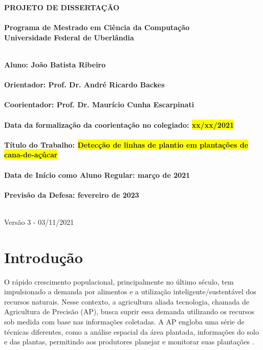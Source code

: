 \documentclass[12pt, a4paper, english, brazil]{article}
\newcommand{\textRed}[1]{{{\color{red} #1}}}
\begin{document}
\rhead{\thepage}

\begin{center}
	\bf{\LARGE{PROJETO DE DISSERTAÇÃO}\\ $\ $\\}
	\Large{Programa de Mestrado em Ciência da Computação\\
		Universidade Federal de Uberlândia}\\ $\ $\\
\end{center}

\begin{center}
	\bf{Aluno: João Batista Ribeiro\\ $\ $\\
		Orientador: Prof. Dr. André Ricardo Backes\\ $\ $\\
		Coorientador: Prof. Dr. Maurício Cunha Escarpinati\\ $\ $\\
		Data da formalização da coorientação no colegiado: \colorbox{yellow}{xx/xx/2021}\\ $\ $\\
		Título do Trabalho: \colorbox{yellow}{Detecção de linhas de plantio em plantações de cana-de-açúcar}\\ $\ $\\
		Data de Início como Aluno Regular: março de 2021\\ $\ $\\
		Previsão da Defesa: fevereiro de 2023\\ $\ $\\}
\end{center}

\textRed{Versão 3 - 03/11/2021}

\section{Introdução}

O rápido crescimento populacional, principalmente no último século, tem impulsionado a demanda por alimentos e a utilização inteligente/sustentável dos recursos naturais. Nesse contexto, a agricultura aliada tecnologia, chamada de Agricultura de Precisão (AP), busca suprir essa demanda utilizando os recursos sob medida com base nas informações coletadas. A AP engloba uma série de técnicas diferentes, como a análise espacial da área plantada, informações do solo e das plantas, permitindo aos produtores planejar e monitorar suas plantações \cite{Blasch_2020}.
\end{document}
